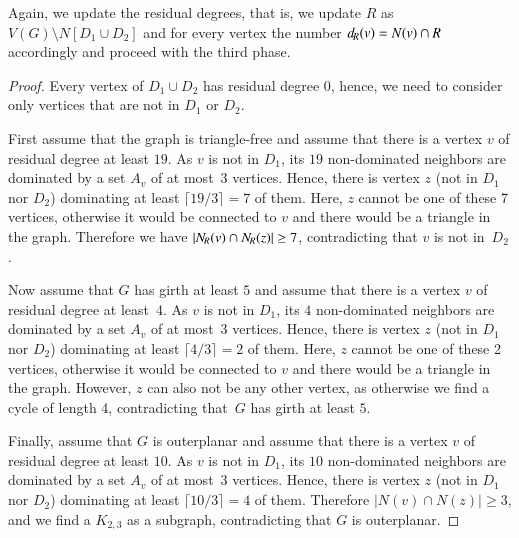 Again, we update the residual degrees, that is, we update
$R$ as $V(G)\setminus N[D_1\cup D_2]$ and for every vertex the
number $d_{\hspace{-1pt}R}(v)=N(v)\cap R$ accordingly and proceed with
the third phase.

\begin{proof}
  Every vertex of $D_1\cup D_2$ has residual degree $0$, hence, we
  need to consider only vertices that are not in $D_1$ or $D_2$.

  First assume that the graph is triangle-free and
  assume that there is a vertex $v$ of residual degree at least $19$.
  As $v$ is not in $D_1$, its $19$ non-dominated
  neighbors are dominated by a
  set $A_v$ of at most~3 vertices. Hence, there is vertex $z$ (not in $D_1$
  nor $D_2$) dominating at least $\lceil 19/3\rceil = 7$ of them.
  Here, $z$ cannot be one of these 7 vertices, otherwise it would be connected
  to $v$ and there would be a triangle in the graph.
  Therefore we
  have $|N_{\hspace{-1pt}R}(v)\cap N_{\hspace{-1pt}R}(z)|\geq 7$, contradicting that $v$ is not in~$D_2$.

  Now assume that $G$ has girth at least $5$ and
  assume that there is a vertex $v$ of residual degree at least~$4$.
  As $v$ is not in $D_1$, its $4$ non-dominated
  neighbors are dominated by a
  set $A_v$ of at most~3 vertices. Hence, there is vertex $z$ (not in $D_1$
  nor $D_2$) dominating at least $\lceil 4/3\rceil = 2$ of them.
  Here, $z$ cannot be one of these 2 vertices, otherwise it would be connected
  to $v$ and there would be a triangle in the graph. However, $z$ can
  also not be any other vertex, as otherwise we find a cycle of length $4$,
  contradicting that~$G$ has girth at least $5$.

  Finally, assume that $G$ is outerplanar and
  assume that there is a vertex $v$ of residual degree at least $10$.
  As $v$ is not in $D_1$, its $10$ non-dominated
  neighbors are dominated by a
  set $A_v$ of at most~3 vertices. Hence, there is vertex $z$ (not in $D_1$
  nor $D_2$) dominating at least $\lceil 10/3\rceil = 4$ of them.
  Therefore $|N(v)\cap N(z)|\geq 3$, and we find a $K_{2,3}$ as a
  subgraph, contradicting that $G$ is outerplanar.
\end{proof}


